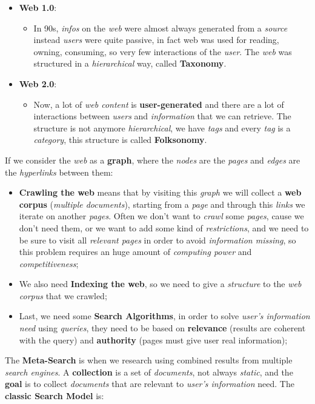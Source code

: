 \documentclass{article}
\begin{document}
\begin{itemize}
\item \textbf{Web 1.0}:
\begin{itemize}
\item In 90s, \emph{infos} on the \emph{web} were almost always generated from a \emph{source} instead \emph{users} were quite passive, in fact web was used for reading, owning, consuming, so very few interactions of the \emph{user}. The \emph{web} was structured in a \emph{hierarchical} way, called \textbf{Taxonomy}.
\end{itemize}
\item \textbf{Web 2.0}:
\begin{itemize}
\item Now, a lot of\emph{ web content} is \textbf{user-generated} and there are a lot of interactions between \emph{users} and \emph{information} that we can retrieve. The structure is not anymore \emph{hierarchical}, we have \emph{tags} and every \emph{tag} is a \emph{category}, this structure is called \textbf{Folksonomy}.
\end{itemize}
\end{itemize}
If we consider the \emph{web} as a \textbf{graph}, where the \emph{nodes} are the \emph{pages} and \emph{edges} are the \emph{hyperlinks} between them:
\begin{itemize}
\item \textbf{Crawling the web} means that by visiting this \emph{graph} we will collect a \textbf{web corpus} (\emph{multiple documents}), starting from a \emph{page} and through this \emph{links} we iterate on another \emph{pages}. Often we don't want to \emph{crawl} some \emph{pages}, cause we don't need them, or we want to add some kind of \emph{restrictions}, and we need to be sure to visit all \emph{relevant pages} in order to avoid \emph{information missing}, so this problem requires an huge amount of \emph{computing power} and \emph{competitiveness};
\item We also need \textbf{Indexing the web}, so we need to give a \emph{structure} to the \emph{web corpus} that we crawled;
\item Last, we need some \textbf{Search Algorithms}, in order to solve \emph{user's information need} using \emph{queries}, they need to be based on \textbf{relevance} (results are coherent with the query) and \textbf{authority} (pages must give user real information);
\end{itemize}  
The \textbf{Meta-Search} is when we research using combined results from multiple \emph{search engines}. A \textbf{collection} is a set of \emph{documents}, not always \emph{static}, and the \textbf{goal} is to collect \emph{documents} that are relevant to\emph{ user's information} need. The \textbf{classic Search Model} is:\\
\end{document}
